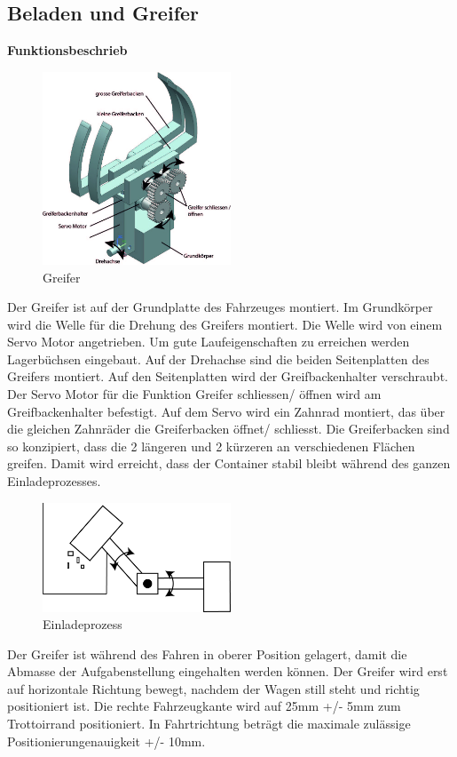 \subsection{Beladen und Greifer}

\textbf{Funktionsbeschrieb}
\begin{figure}[H]
\centering
\includegraphics[width=0.5\textwidth]{03_Loesungskonzept/pictures/greifer3.jpg}
\caption{Greifer}
\end{figure}

Der Greifer ist auf der Grundplatte des Fahrzeuges montiert. Im Grundkörper wird die Welle für die Drehung des Greifers montiert. Die Welle wird von einem Servo Motor angetrieben. Um gute Laufeigenschaften zu erreichen werden Lagerbüchsen eingebaut. Auf der Drehachse sind die beiden Seitenplatten des Greifers montiert. Auf den Seitenplatten wird der Greifbackenhalter verschraubt.  Der Servo Motor für die Funktion Greifer schliessen/ öffnen wird am Greifbackenhalter befestigt. Auf dem Servo wird ein Zahnrad montiert, das über die gleichen Zahnräder die Greiferbacken öffnet/ schliesst. Die Greiferbacken sind so konzipiert, dass die 2 längeren und 2 kürzeren an verschiedenen Flächen greifen. Damit wird erreicht, dass der Container stabil bleibt während des ganzen Einladeprozesses. 

\begin{figure}[H]
\centering
\includegraphics[width=0.5\textwidth]{03_Loesungskonzept/pictures/Beladen_1.png}
\caption{Einladeprozess}
\end{figure}
Der Greifer ist während des Fahren in oberer Position gelagert, damit die Abmasse der Aufgabenstellung eingehalten werden können. Der Greifer wird erst auf horizontale Richtung bewegt, nachdem der Wagen still steht und richtig positioniert ist.
Die rechte Fahrzeugkante wird auf 25mm +/- 5mm zum Trottoirrand positioniert. In Fahrtrichtung beträgt die maximale zulässige Positionierungenauigkeit +/- 10mm.

